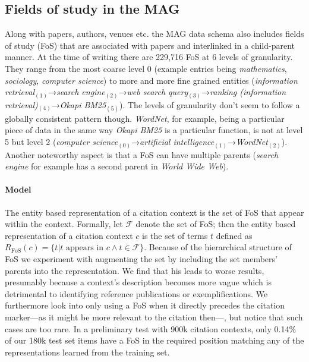 \subsection{Fields of study in the MAG}
Along with papers, authors, venues etc. the MAG data schema also includes fields of study (FoS) that are associated with papers and interlinked in a child-parent manner. At the time of writing there are 229,716 FoS at 6 levels of granularity. They range from the most coarse level 0 (example entries being \emph{mathematics}, \emph{sociology},  \emph{computer science}) to more and more fine grained entities (\emph{information retrieval}$_{(1)}$→\emph{search engine}$_{(2)}$→\emph{web search query}$_{(3)}$→\emph{ranking (information retrieval)}$_{(4)}$→\emph{Okapi BM25}$_{(5)}$). The levels of granularity don't seem to follow a globally consistent pattern though. \emph{WordNet}, for example, being a particular piece of data in the same way \emph{Okapi BM25} is a particular function, is not at level 5 but level 2 (\emph{computer science}$_{(0)}$→\emph{artificial intelligence}$_{(1)}$→\emph{WordNet}$_{(2)}$). Another noteworthy aspect is that a FoS can have multiple parents (\emph{search engine} for example has a second parent in \emph{World Wide Web}).

\paragraph{Model} The entity based representation of a citation context is the set of FoS that appear within the context. Formally, let $\mathcal{F}$ denote the set of FoS; then the entity based representation of a citation context $c$ is the set of terms $t$ defined as ${R_{\text{FoS}}(c) = \{t|t\text{ appears in }c \land t\in \mathcal{F}\}}$. Because of the hierarchical structure of FoS we experiment with augmenting the set by including the set members' parents into the representation. We find that his leads to worse results, presumably because a context's description becomes more vague which is detrimental to identifying reference publications or exemplifications. We furthermore look into only using a FoS when it directly precedes the citation marker---as it might be more relevant to the citation then---, but notice that such cases are too rare. In a preliminary test with 900k citation contexts, only 0.14\% of our 180k test set items have a FoS in the required position matching any of the representations learned from the training set.

